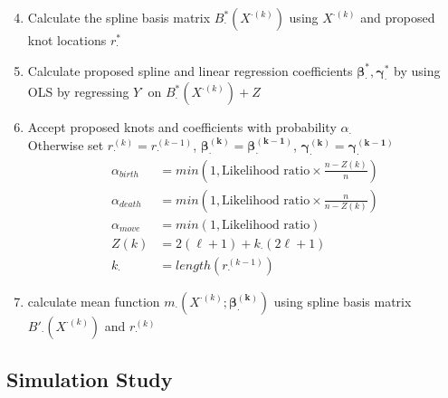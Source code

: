 \documentclass[handout]{beamer}\usepackage[]{graphicx}\usepackage[]{color}
\begin{document}
\begin{frame}

\begin{enumerate}
\setcounter{enumi}{3}
\item
Calculate the spline basis matrix $B^*_{\cdot}(X^{\cdot(k)})$ using $X^{\cdot(k)}$ and proposed knot locations $r_{\cdot}^{*}$

\item
Calculate proposed spline and linear regression coefficients $\boldsymbol{\beta^*_{\cdot}},\boldsymbol{\gamma^*_{\cdot}}$ by using OLS by regressing $Y^{\cdot}$ on $B^*_{\cdot}(X^{\cdot(k)}) + Z$

\item
Accept proposed knots and coefficients with probability $\alpha_{\cdot}$ \\

Otherwise set $r_{\cdot}^{(k)}=r_{\cdot}^{(k-1)}$, $\boldsymbol{\beta^{(k)}_{\cdot}} =\boldsymbol{\beta^{(k-1)}_{\cdot}}$, $\boldsymbol{\gamma^{(k)}_{\cdot}} =\boldsymbol{\gamma^{(k-1)}_{\cdot}}$\\

\begin{align*}
\alpha_{birth} &= min\left(1, \text{Likelihood ratio}\times \frac{n-Z(k)}{n} \right) \\
\alpha_{death} &= min\left(1, \text{Likelihood ratio}\times \frac{n}{n-Z(k)} \right) \\
\alpha_{move} &= min\left(1, \text{Likelihood ratio}\right) \\
Z(k) &= 2(\ell+1) + k_{\cdot}(2\ell+1) \\
k_{\cdot} &= length(r_{\cdot}^{(k-1)}) 
\end{align*}


\item
calculate mean function $m_{\cdot}(X^{\cdot(k)};\boldsymbol{\beta^{(k)}_{\cdot}})$ using spline basis matrix $B'_{\cdot}(X^{\cdot(k)})$ and $r_{\cdot}^{(k)}$


\end{enumerate}

\end{frame}

\subsection{Simulation Study}
\end{document}
